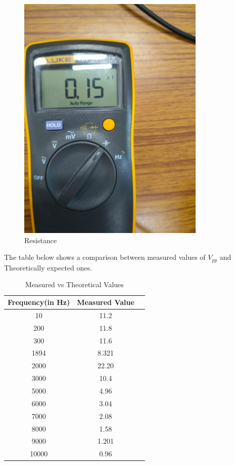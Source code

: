 \documentclass[a4paper,12pt]{article}
\begin{document}
\begin{figure}[H]
    \centering
    \includegraphics[width=0.8\textwidth]{fig/m/nf.jpeg}
    \caption{Resistance}
    \label{fig:your-label}
\end{figure}


The table below shows a comparison between measured values of $V_{pp}$ and Theoretically expected ones. 
\begin{table}[H]
\centering
\begin{tabular}{|c|c|c|}
\hline
\textbf{Frequency(in Hz)} & \textbf{Measured Value}  \\
\hline
10 & 11.2   \\
200 & 11.8     \\
300 & 11.6   \\
1894 & 8.321   \\
2000 & 22.20   \\
3000 & 10.4  \\
5000 & 4.96  \\
6000 & 3.04   \\
7000 & 2.08  \\
8000 & 1.58  \\
9000 & 1.201  \\
10000 & 0.96  \\

\hline
\end{tabular}
\caption{Measured vs Theoretical Values}
\end{table}
\end{document}
